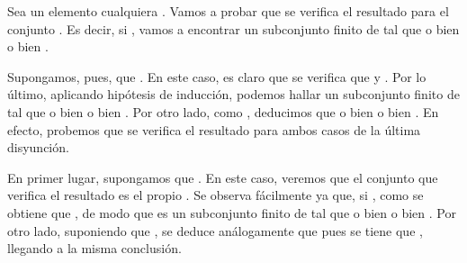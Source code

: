 \begin{isabellebody}
\begin{isamarkuptext}
\begin{demostracion}
    Sea un elemento cualquiera . Vamos a probar que se verifica el resultado para el conjunto
    . Es decir, si , vamos a encontrar un subconjunto finito  de 
     tal que o bien  o bien .

    Supongamos, pues, que . En este caso, es claro que se verifica que
     y . Por lo último, aplicando hipótesis de inducción, podemos hallar 
    un subconjunto finito  de  tal que o bien  o bien . Por otro lado,
    como , deducimos que o bien  o bien . En efecto, probemos que se 
    verifica el resultado para ambos casos de la última disyunción.

    En primer lugar, supongamos que . En este caso, veremos que el conjunto  que 
    verifica el resultado es el propio . Se observa fácilmente ya que, si , como 
     se obtiene que , de modo que  es un subconjunto finito de 
     tal que o bien  o bien . Por otro lado, suponiendo que 
    , se deduce análogamente que  pues se tiene que , llegando
    a la misma conclusión.


\end{demostracion}
\end{isamarkuptext}
\end{isabellebody}
